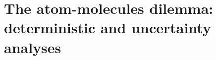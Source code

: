 \documentclass[a4paper,twoside,10pt,final]{memoir} %
\begin{document}
%
%
%
%
\clearemptydoublepage
\chapter{The atom-molecules dilemma: deterministic and uncertainty analyses} 
\label{chap:atom_mol}

\clearpage


%
%
%


%
\end{document}
